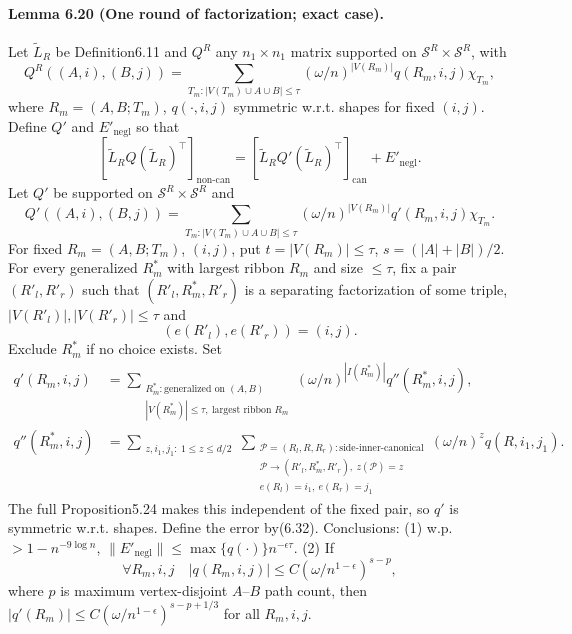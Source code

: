 \documentclass[10pt,a4paper]{article}
\begin{document}
\paragraph{Lemma 6.20 (One round of factorization; exact case).} Let $\widetilde L_R$ be Definition6.11 and $Q^R$ any $n_1\times n_1$ matrix supported on $\mathcal S^R\times\mathcal S^R$, with
\[Q^R((A,i),(B,j))=\sum_{T_m:|V(T_m)\cup A\cup B|\le\tau}(\omega/n)^{|V(R_m)|}q(R_m,i,j)\chi_{T_m},\tag{6.31}\]
where $R_m=(A,B;T_m)$, $q(\cdot,i,j)$ symmetric w.r.t. shapes for fixed $(i,j)$. Define $Q'$ and $E'_{\mathrm{negl}}$ so that
\[[\widetilde L_RQ(\widetilde L_R)^\top]_{\mathrm{non\text{-}can}}=[\widetilde L_RQ'(\widetilde L_R)^\top]_{\mathrm{can}}+E'_{\mathrm{negl}}.\tag{6.32}\]
Let $Q'$ be supported on $\mathcal S^R\times\mathcal S^R$ and
\[Q'((A,i),(B,j))=\sum_{T_m:|V(T_m)\cup A\cup B|\le\tau}(\omega/n)^{|V(R_m)|}q'(R_m,i,j)\chi_{T_m}.\tag{6.33}\]
For fixed $R_m=(A,B;T_m)$, $(i,j)$, put $t=|V(R_m)|\le\tau$, $s=(|A|+|B|)/2$. For every generalized $R^*_m$ with largest ribbon $R_m$ and size $\le\tau$, fix a pair $(R'_l,R'_r)$ such that $(R'_l,R^*_m,R'_r)$ is a separating factorization of some triple, $|V(R'_l)|,|V(R'_r)|\le\tau$ and
\[(e(R'_l),e(R'_r))=(i,j).\tag{6.34}\]
Exclude $R^*_m$ if no choice exists. Set
\begin{align*}q'(R_m,i,j)&=\sum_{\substack{R^*_m:\text{generalized on }(A,B)\\|V(R^*_m)|\le\tau,\ \text{largest ribbon }R_m}}(\omega/n)^{|I(R^*_m)|}q''(R^*_m,i,j),\\q''(R^*_m,i,j)&=\sum_{\substack{z,i_1,j_1:\ 1\le z\le d/2}}\sum_{\substack{\mathcal P=(R_l,R,R_r):\text{side-inner-canonical}\\\mathcal P\to(R'_l,R^*_m,R'_r),\ z(\mathcal P)=z\\e(R_l)=i_1,\ e(R_r)=j_1}}(\omega/n)^zq(R,i_1,j_1).\tag{6.35}\end{align*}
The full Proposition5.24 makes this independent of the fixed pair, so $q'$ is symmetric w.r.t. shapes. Define the error by(6.32). Conclusions: (1) w.p. $>1-n^{-9\log n}$, $\|E'_{\mathrm{negl}}\|\le\max\{q(\cdot)\}n^{-\epsilon\tau}$. (2) If
\[\forall R_m,i,j\quad|q(R_m,i,j)|\le C(\omega/n^{1-\epsilon})^{s-p},\tag{6.36}\]
where $p$ is maximum vertex-disjoint $A$--$B$ path count, then $|q'(R_m)|\le C(\omega/n^{1-\epsilon})^{s-p+1/3}$ for all $R_m,i,j$.
\end{document}
